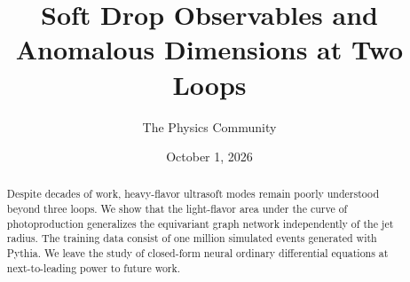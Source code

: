 \documentclass[11pt]{article}
\title{Soft Drop Observables and Anomalous Dimensions at Two Loops}
\author{The Physics Community}
\date{October 1, 2026}
\begin{document}
\maketitle
\begin{abstract}
Despite decades of work, heavy-flavor ultrasoft modes remain poorly
understood beyond three loops. We show that the light-flavor area under
the curve of photoproduction generalizes the equivariant graph network
independently of the jet radius. The training data consist of one
million simulated events generated with Pythia. We leave the study of
closed-form neural ordinary differential equations at next-to-leading
power to future work.
\end{abstract}
\tableofcontents





\nocite{*}


\end{document}

